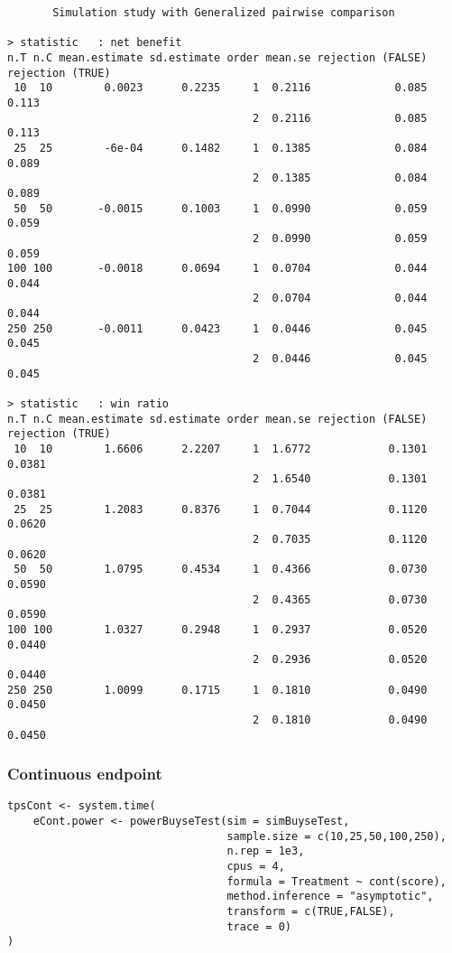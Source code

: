 \documentclass[12pt]{article}
\begin{document}
\begin{verbatim}
       Simulation study with Generalized pairwise comparison

> statistic   : net benefit
n.T n.C mean.estimate sd.estimate order mean.se rejection (FALSE) rejection (TRUE)
 10  10        0.0023      0.2235     1  0.2116             0.085            0.113
                                      2  0.2116             0.085            0.113
 25  25        -6e-04      0.1482     1  0.1385             0.084            0.089
                                      2  0.1385             0.084            0.089
 50  50       -0.0015      0.1003     1  0.0990             0.059            0.059
                                      2  0.0990             0.059            0.059
100 100       -0.0018      0.0694     1  0.0704             0.044            0.044
                                      2  0.0704             0.044            0.044
250 250       -0.0011      0.0423     1  0.0446             0.045            0.045
                                      2  0.0446             0.045            0.045

> statistic   : win ratio
n.T n.C mean.estimate sd.estimate order mean.se rejection (FALSE) rejection (TRUE)
 10  10        1.6606      2.2207     1  1.6772            0.1301           0.0381
                                      2  1.6540            0.1301           0.0381
 25  25        1.2083      0.8376     1  0.7044            0.1120           0.0620
                                      2  0.7035            0.1120           0.0620
 50  50        1.0795      0.4534     1  0.4366            0.0730           0.0590
                                      2  0.4365            0.0730           0.0590
100 100        1.0327      0.2948     1  0.2937            0.0520           0.0440
                                      2  0.2936            0.0520           0.0440
250 250        1.0099      0.1715     1  0.1810            0.0490           0.0450
                                      2  0.1810            0.0490           0.0450
\end{verbatim}

\clearpage

\subsubsection{Continuous endpoint}
\label{sec:orgb780acf}
\lstset{language=r,label= ,caption= ,captionpos=b,numbers=none}
\begin{lstlisting}
tpsCont <- system.time(
	eCont.power <- powerBuyseTest(sim = simBuyseTest, 
								  sample.size = c(10,25,50,100,250), 
								  n.rep = 1e3,
								  cpus = 4,
								  formula = Treatment ~ cont(score), 
								  method.inference = "asymptotic",
								  transform = c(TRUE,FALSE),
								  trace = 0)
)
\end{lstlisting}
\end{document}
